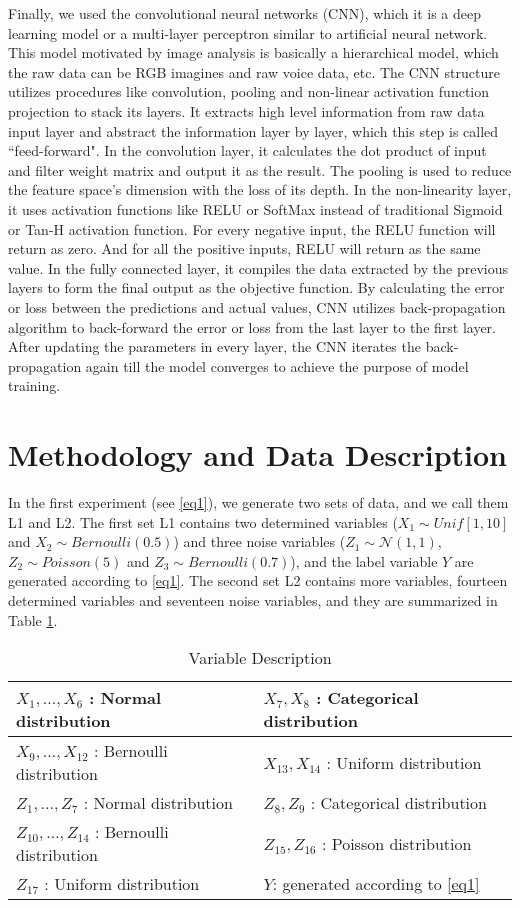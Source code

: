 \documentclass[12pt]{article}
\begin{document}
Finally, we used the convolutional neural networks (CNN), which it is a deep learning model or a multi-layer perceptron similar to artificial neural network. This model motivated by image analysis is basically a hierarchical model, which the raw data can be RGB imagines and raw voice data, etc. The CNN structure utilizes procedures like convolution, pooling and non-linear activation function projection to stack its layers. It extracts high level information from raw data input layer and abstract the information layer by layer, which this step is called ``feed-forward". In the convolution layer, it calculates the dot product of input and filter weight matrix and output it as the result. The pooling is used to reduce the feature space's dimension with the loss of its depth. In the non-linearity layer, it uses activation functions like RELU or SoftMax instead of traditional Sigmoid or Tan-H activation function. For every negative input, the RELU function will return as zero. And for all the positive inputs, RELU will return as the same value. In the fully connected layer, it compiles the data extracted by the previous layers to form the final output as the objective function. By calculating the error or loss between the predictions and actual values, CNN utilizes back-propagation algorithm to back-forward the error or loss from the last layer to the first layer. After updating the parameters in every layer, the CNN iterates the back-propagation again till the model converges to achieve the purpose of model training.


\section{Methodology and Data Description}
In the first experiment (see \eqref{eq1}), we generate two sets of data, and we call them L1 and L2. The first set L1 contains two determined variables ($X_1 \sim Unif[1,10]$ and $X_2 \sim Bernoulli(0.5)$) and three noise variables ($Z_{1} \sim \mathcal{N}(1,1)$, $Z_{2} \sim Poisson(5) $ and $Z_{3} \sim Bernoulli(0.7)$), and the label variable $Y$ are generated according to \eqref{eq1}. The second set L2 contains more variables, fourteen determined variables and seventeen noise variables, and they are summarized in Table \ref{tab1}.
\begin{table}
\centering
\caption{Variable Description}
\label{tab1}
\begin{tabular}{|l|l|} 
\hline
 $X_1, \dots, X_6$ : Normal distribution
 &
  $X_7, X_8$ : Categorical distribution  \\
\hline  
  $X_9, \dots, X_{12}$ : Bernoulli distribution 
  &
  $X_{13}, X_{14}$ : Uniform distribution  \\
\hline
  $Z_1, \dots, Z_7$ :   Normal distribution
 &
  $Z_8, Z_9$ : Categorical distribution  \\
 \hline
  $Z_{10}, \dots, Z_{14}$ : Bernoulli distribution
  &
  $Z_{15}, Z_{16}$ : Poisson distribution  \\
\hline
  $Z_{17}$ : Uniform distribution 
  &
  $Y$: generated according to \eqref{eq1}  \\
\hline 
\end{tabular} 
\end{table}
\end{document}
